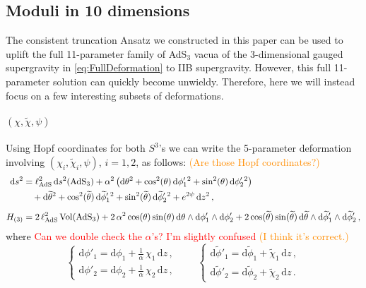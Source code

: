 \documentclass[a4paper, 11pt]{article}
\numberwithin{equation}{section}
\newcommand{\ts}[1]{\widetilde{#1}}
\newcommand{\+}{\oplus}
\renewcommand{\d}{\ensuremath{\mathrm{d}}\xspace}
\newcommand{\EM}[1]{\textcolor{red}{#1}}
\newcommand{\CE}[1]{\textcolor{darkorange}{#1}}
\begin{document}
\subsection{Moduli in 10 dimensions}
The consistent truncation Ansatz we constructed in this paper can be used to uplift the full 11-parameter family of AdS$_3$ vacua of the 3-dimensional gauged supergravity in \eqref{eq:FullDeformation} to IIB supergravity. However, this full 11-parameter solution can quickly become unwieldy. Therefore, here we will instead focus on a few interesting subsets of deformations.


\paragraph{\boldmath $(\chi, \ts{\chi}, \psi)$}
Using Hopf coordinates for both $S^3$'s we can write the 5-parameter deformation involving $(\chi_i, \ts{\chi}_i, \psi)$, $i = 1,2$, as follows: \CE{(Are those Hopf coordinates?)}
\begin{equation}
	\begin{split}
		\d s^{2} &= \ell_{\rm AdS}^{2} \,\d s^{2}({\rm AdS}_{3}) +\alpha^{2}\left(\d\theta^{2} + \cos^{2}(\theta)\,\d\phi'_{1}{}^{2} + \sin^{2}(\theta)\,\d\phi'_{2}{}^{2} \right) \\
		&\quad +\d\ts{\theta}^{2} + \cos^{2}(\ts{\theta})\,\d\ts{\phi}'_{1}{}^{2} + \sin^{2}(\ts{\theta})\,\d\ts{\phi}'_{2}{}^{2} + e^{2\psi}\,\d z^{2}\,, \\[5pt]
		H_{(3)} &= 2\,\ell_{\rm AdS}^{2}\,{\rm Vol}({\rm AdS_{3}}) + 2\,\alpha^{2}\cos(\theta)\sin(\theta)\,\d\theta\wedge\d\phi'_{1}\wedge\d\phi'_{2}+ 2\cos(\ts{\theta})\sin(\ts{\theta})\,\d\ts{\theta}\wedge\d\ts{\phi}'_{1}\wedge\d\ts{\phi}'_{2}\,,
	\end{split}
\end{equation}
where \EM{Can we double check the $\alpha$'s? I'm slightly confused} \CE{(I think it's correct.)}
\begin{equation}
	\begin{cases}
		\displaystyle \d\phi'_{1} = \d\phi_{1} + \frac{1}{\alpha}\,\chi_{1}\,\d z\,,\\[6pt]
		\displaystyle \d\phi'_{2} = \d\phi_{2} + \frac{1}{\alpha}\,\chi_{2}\,\d z\,,
	\end{cases}\qquad
	\begin{cases}
		\d\ts{\phi}'_{1} = \d\ts{\phi}_{1} + \ts{\chi}_{1}\,\d z\,,\\[6pt]
		\d\ts{\phi}'_{2} = \d\ts{\phi}_{2} + \ts{\chi}_{2}\,\d z\,.
	\end{cases}
\end{equation}
\end{document}
